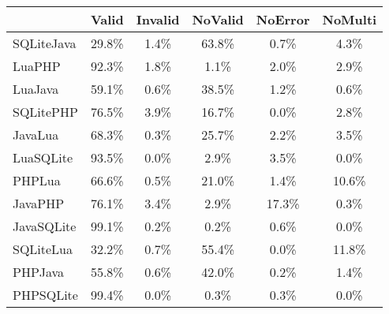\begin{tabular}{l  c  c  c  c  c }
    \toprule
        & Valid & Invalid & NoValid & NoError & NoMulti \\
    \midrule
    SQLiteJava & 29.8\% & 1.4\% & 63.8\% & 0.7\% & 4.3\% \\
    LuaPHP & 92.3\% & 1.8\% & 1.1\% & 2.0\% & 2.9\% \\
    LuaJava & 59.1\% & 0.6\% & 38.5\% & 1.2\% & 0.6\% \\
    SQLitePHP & 76.5\% & 3.9\% & 16.7\% & 0.0\% & 2.8\% \\
    JavaLua & 68.3\% & 0.3\% & 25.7\% & 2.2\% & 3.5\% \\
    LuaSQLite & 93.5\% & 0.0\% & 2.9\% & 3.5\% & 0.0\% \\
    PHPLua & 66.6\% & 0.5\% & 21.0\% & 1.4\% & 10.6\% \\
    JavaPHP & 76.1\% & 3.4\% & 2.9\% & 17.3\% & 0.3\% \\
    JavaSQLite & 99.1\% & 0.2\% & 0.2\% & 0.6\% & 0.0\% \\
    SQLiteLua & 32.2\% & 0.7\% & 55.4\% & 0.0\% & 11.8\% \\
    PHPJava & 55.8\% & 0.6\% & 42.0\% & 0.2\% & 1.4\% \\
    PHPSQLite & 99.4\% & 0.0\% & 0.3\% & 0.3\% & 0.0\% \\
    \bottomrule
\end{tabular}
        
